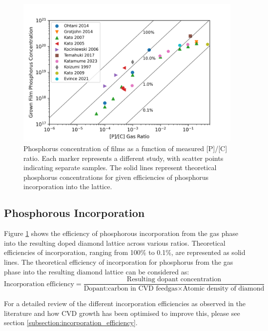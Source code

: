 \begin{figure}[h]
\centering
\includegraphics[width=\textwidth]{grown concentration vs gas ratio.png}
\caption{Phosphorus concentration of films as a function of measured [P]/[C] ratio. Each marker represents a different study, with scatter points indicating separate samples. The solid lines represent theoretical phosphorus concentrations for given efficiencies of phosphorus incorporation into the lattice.}
\label{fig:phos_concentration}
\end{figure}

\subsection{Phosphorous Incorporation}
Figure \ref{fig:phos_concentration} shows the efficiency of phosphorous incorporation from the gas phase into the resulting doped diamond lattice across various ratios. Theoretical efficiencies of incorporation, ranging from 100\% to 0.1\%, are represented as solid lines. The theoretical efficiency of incorporation for phosphorus from the gas phase into the resulting diamond lattice can be considered as:
\begin{equation}
\label{eq:incorporation_breakdown}
    \text{Incorporation efficiency} = \frac{\text{Resulting dopant concentration}}{\text{Dopant:carbon in CVD feedgas} \times \text{Atomic density of diamond}}
\end{equation}

For a detailed review of the different incorporation efficiencies as observed in the literature and how CVD growth has been optimised to improve this, please see section \ref{subsection:incorporation_efficiency}.

